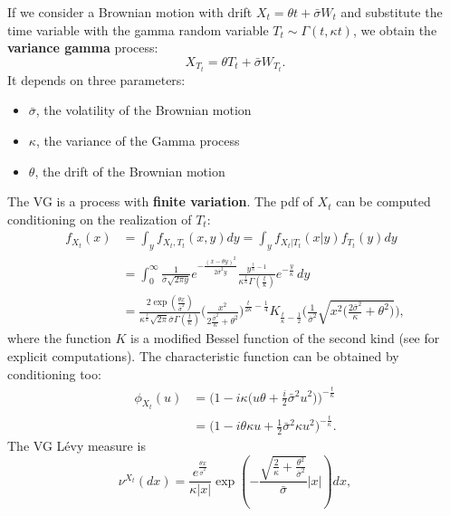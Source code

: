 \documentclass[a4paper,10pt]{article}
\begin{document}
If we consider a Brownian motion with drift $X_t = \theta t + \bar\sigma W_t$ and substitute the time variable with the gamma random variable
$T_t \sim \Gamma(t,\kappa t)$,
we obtain the \textbf{variance gamma} process:
\begin{equation}\label{VG_process}
 X_{T_t} = \theta T_t + \bar\sigma W_{T_t} .
\end{equation}
It depends on three parameters:
\begin{itemize}
 \item $\bar\sigma$, the volatility of the Brownian motion
 \item $\kappa$, the variance of the Gamma process
 \item $\theta$, the drift of the Brownian motion
\end{itemize}
The VG is a process with \textbf{finite variation}. 
The pdf of $X_t$ can be computed conditioning on the realization of $T_t$:
\begin{align}\label{VG_density}
 f_{X_t}(x) &= \int_y f_{X_t,T_t}(x,y) dy = \int_y f_{X_t|T_t}(x|y) f_{T_t}(y) dy \\ \nonumber
         &= \int_0^{\infty} \frac{1}{\bar\sigma \sqrt{2\pi y}} e^{-\frac{(x -\theta y)^2}{2\bar\sigma^2 y}}
         \frac{y^{\frac{t}{\kappa} -1}}{\kappa^{\frac{t}{\kappa}} \Gamma(\frac{t}{\kappa})}
          e^{-\frac{y}{\kappa}} \, dy \\ \nonumber
         &= \frac{2 \exp(\frac{\theta x}{\bar\sigma^2})}{\kappa^{\frac{t}{\kappa}} \sqrt{2\pi}\bar\sigma \Gamma(\frac{t}{\kappa}) }
            \biggl( \frac{x^2}{2\frac{\bar\sigma^2}{\kappa} + \theta^2} \biggr)^{\frac{t}{2\kappa}-\frac{1}{4}} 
            K_{\frac{t}{\kappa}-\frac{1}{2}} 
            \biggl( \frac{1}{\bar\sigma^2} \sqrt{x^2 \bigl(\frac{2\bar\sigma^2}{\kappa}+\theta^2 \bigr)} \biggr),
\end{align}
where the function $K$ is a modified Bessel function of the second kind (see \cite{MCC98} for explicit computations).
The characteristic function can be obtained by conditioning too: 
\begin{align*}
 \phi_{X_t}(u) &= \biggl( 1-i \kappa \bigl( u\theta +\frac{i}{2}\bar\sigma^2 u^2 \bigr) \biggr)^{-\frac{t}{\kappa}} \\  
	       &= \biggl( 1-i\theta \kappa u + \frac{1}{2} \bar\sigma^2 \kappa u^2 \biggr)^{-\frac{t}{\kappa}}.
\end{align*}
The VG Lévy measure is
\begin{equation}\label{VG_measure}
 \nu^{X_t}(dx) = \frac{e^{\frac{\theta x}{\bar\sigma^2}}}{\kappa|x|} \exp 
 \left( - \frac{\sqrt{\frac{2}{\kappa} + \frac{\theta^2}{\bar\sigma^2}}}{\bar\sigma} |x|\right) dx,
\end{equation}
\end{document}
